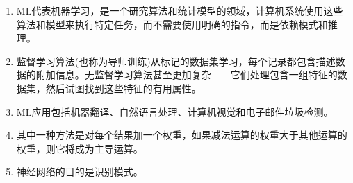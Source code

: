 \begin{enumerate}
	\item ML代表机器学习，是一个研究算法和统计模型的领域，计算机系统使用这些算法和模型来执行特定任务，而不需要使用明确的指令，而是依赖模式和推理。
	\item 监督学习算法(也称为导师训练)从标记的数据集学习，每个记录都包含描述数据的附加信息。无监督学习算法甚至更加复杂——它们处理包含一组特征的数据集，然后试图找到这些特征的有用属性。
	\item ML应用包括机器翻译、自然语言处理、计算机视觉和电子邮件垃圾检测。
	\item 其中一种方法是对每个结果加一个权重，如果减法运算的权重大于其他运算的权重，则它将成为主导运算。
	\item 神经网络的目的是识别模式。 
\end{enumerate}












